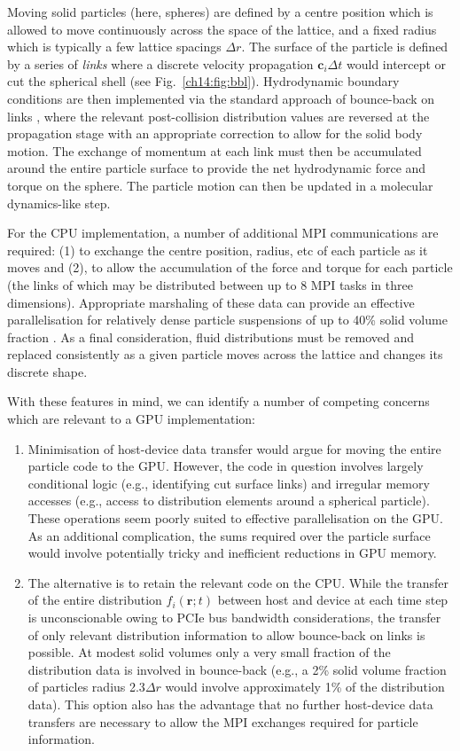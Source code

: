 Moving solid particles (here, spheres) are defined by a centre position
which is allowed to move continuously across the space of the lattice,
and a fixed radius which is typically a few lattice spacings $\Delta r$.
The surface of the particle is defined by a series of \textit{links}
where a discrete velocity propagation $\mathbf{c}_i \Delta t$ would
intercept or cut the spherical shell (see Fig.~\ref{ch14:fig:bbl}).
Hydrodynamic boundary conditions are then implemented via the standard
approach of bounce-back on links \cite{ladd1994, nguyen2002}, where the
relevant post-collision distribution values are reversed at the
propagation stage with an appropriate correction to allow for the
solid body motion. The exchange of momentum at each link must then be
accumulated around the entire particle surface to provide the net
hydrodynamic force
and torque on the sphere. The particle motion can then be updated in a
molecular dynamics-like step.

For the CPU implementation, a number of additional MPI communications
are required: (1) to exchange the centre position, radius, etc of each
particle as it moves and (2), to allow the accumulation of the force
and torque for each particle (the links of which may be distributed
between up to 8 MPI tasks in three dimensions). Appropriate marshaling
of these data can provide an effective parallelisation for relatively
dense particle suspensions of up to  40\% solid volume fraction
\cite{stratford2008}. As a final consideration, fluid distributions
must be removed and replaced consistently as a given particle moves
across the lattice and changes its discrete shape.

With these features in mind, we can identify a number of competing
concerns which are relevant to a GPU implementation:
\begin{enumerate}
\item
Minimisation of host-device data transfer would argue for moving the
entire particle code to the GPU. However, the code in question involves
largely conditional logic (e.g., identifying cut surface links) and
irregular memory accesses (e.g., access to distribution elements around
a spherical particle). These operations seem poorly suited to effective
parallelisation on the GPU. As an additional complication, the sums
required over the particle surface would involve potentially tricky
and inefficient reductions in GPU memory.
\item
The alternative is to retain the relevant code on the CPU. While the
transfer of the entire distribution $f_i(\mathbf{r};t)$ between host
and device at each time step is unconscionable owing to PCIe bus bandwidth
considerations, the transfer of only relevant distribution information
to allow bounce-back on links is possible. At modest solid volumes
only a very small fraction of the distribution data is
involved in bounce-back (e.g., a 2\% solid volume fraction of particles
radius 2.3$\Delta r$ would involve approximately 1\% of the distribution
data). This option also has the advantage that no further host-device
data transfers are necessary to allow the MPI exchanges required for
particle information.
\end{enumerate}


